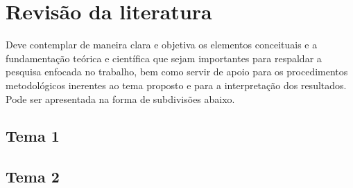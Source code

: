 \chapter{Revisão da literatura}

Deve contemplar de maneira clara e objetiva os elementos conceituais e a fundamentação teórica e científica que sejam importantes para respaldar a pesquisa enfocada no trabalho, bem como servir de apoio para os procedimentos metodológicos inerentes ao tema proposto e para a interpretação dos resultados.  Pode ser apresentada na forma de subdivisões abaixo. 

\section{Tema 1}

\section{Tema 2}
